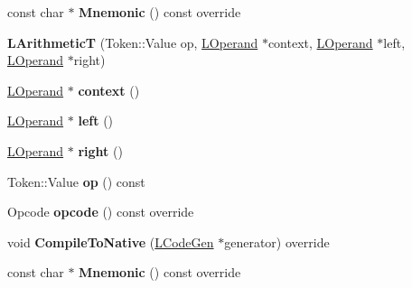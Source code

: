 \begin{DoxyCompactItemize}
\item 
const char $\ast$ {\bfseries Mnemonic} () const  override\hypertarget{classv8_1_1internal_1_1_l_arithmetic_t_abaa7a014d65c1b89c93ab7fc44003c15}{}\label{classv8_1_1internal_1_1_l_arithmetic_t_abaa7a014d65c1b89c93ab7fc44003c15}

\item 
{\bfseries L\+ArithmeticT} (Token\+::\+Value op, \hyperlink{classv8_1_1internal_1_1_l_operand}{L\+Operand} $\ast$context, \hyperlink{classv8_1_1internal_1_1_l_operand}{L\+Operand} $\ast$left, \hyperlink{classv8_1_1internal_1_1_l_operand}{L\+Operand} $\ast$right)\hypertarget{classv8_1_1internal_1_1_l_arithmetic_t_aed09089ca0bd6bd7614897b04b1d89d6}{}\label{classv8_1_1internal_1_1_l_arithmetic_t_aed09089ca0bd6bd7614897b04b1d89d6}

\item 
\hyperlink{classv8_1_1internal_1_1_l_operand}{L\+Operand} $\ast$ {\bfseries context} ()\hypertarget{classv8_1_1internal_1_1_l_arithmetic_t_ab306728ac49c78f6fe8eec0faafec98d}{}\label{classv8_1_1internal_1_1_l_arithmetic_t_ab306728ac49c78f6fe8eec0faafec98d}

\item 
\hyperlink{classv8_1_1internal_1_1_l_operand}{L\+Operand} $\ast$ {\bfseries left} ()\hypertarget{classv8_1_1internal_1_1_l_arithmetic_t_a62140bad6c260c92f8c86d7083874a9c}{}\label{classv8_1_1internal_1_1_l_arithmetic_t_a62140bad6c260c92f8c86d7083874a9c}

\item 
\hyperlink{classv8_1_1internal_1_1_l_operand}{L\+Operand} $\ast$ {\bfseries right} ()\hypertarget{classv8_1_1internal_1_1_l_arithmetic_t_ad65b8493527788115befa0634f9de1ae}{}\label{classv8_1_1internal_1_1_l_arithmetic_t_ad65b8493527788115befa0634f9de1ae}

\item 
Token\+::\+Value {\bfseries op} () const \hypertarget{classv8_1_1internal_1_1_l_arithmetic_t_ab6979d3ffa80748d912d58539cfe971c}{}\label{classv8_1_1internal_1_1_l_arithmetic_t_ab6979d3ffa80748d912d58539cfe971c}

\item 
Opcode {\bfseries opcode} () const  override\hypertarget{classv8_1_1internal_1_1_l_arithmetic_t_a8fb5ae23dc6ddac5a72adfe9028fb08d}{}\label{classv8_1_1internal_1_1_l_arithmetic_t_a8fb5ae23dc6ddac5a72adfe9028fb08d}

\item 
void {\bfseries Compile\+To\+Native} (\hyperlink{classv8_1_1internal_1_1_l_code_gen}{L\+Code\+Gen} $\ast$generator) override\hypertarget{classv8_1_1internal_1_1_l_arithmetic_t_a2ca63e96840eacc1494d0d39ebe782a5}{}\label{classv8_1_1internal_1_1_l_arithmetic_t_a2ca63e96840eacc1494d0d39ebe782a5}

\item 
const char $\ast$ {\bfseries Mnemonic} () const  override\hypertarget{classv8_1_1internal_1_1_l_arithmetic_t_abaa7a014d65c1b89c93ab7fc44003c15}{}\label{classv8_1_1internal_1_1_l_arithmetic_t_abaa7a014d65c1b89c93ab7fc44003c15}

\end{DoxyCompactItemize}

